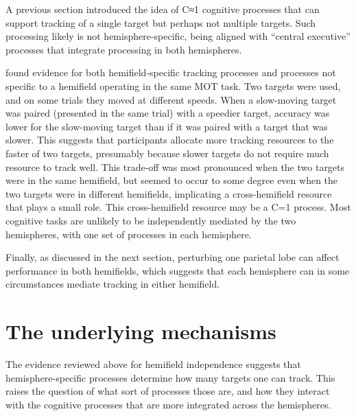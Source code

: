 \documentclass[
]{book}
\begin{document}
A previous section introduced the idea of C≈1 cognitive processes that can support tracking of a single target but perhaps not multiple targets. Such processing likely is not hemisphere-specific, being aligned with ``central executive'' processes that integrate processing in both hemispheres.

\citet{chenResourceDemandsObject2013} found evidence for both hemifield-specific tracking processes and processes not specific to a hemifield operating in the same MOT task. Two targets were used, and on some trials they moved at different speeds. When a slow-moving target was paired (presented in the same trial) with a speedier target, accuracy was lower for the slow-moving target than if it was paired with a target that was slower. This suggests that participants allocate more tracking resources to the faster of two targets, presumably because slower targets do not require much resource to track well. This trade-off was most pronounced when the two targets were in the same hemifield, but seemed to occur to some degree even when the two targets were in different hemifields, implicating a cross-hemifield resource that plays a small role. This cross-hemifield resource may be a C=1 process. Most cognitive tasks are unlikely to be independently mediated by the two hemispheres, with one set of processes in each hemisphere.

Finally, as discussed in the next section, perturbing one parietal lobe can affect performance in both hemifields, which suggests that each hemisphere can in some circumstances mediate tracking in either hemifield.

\hypertarget{the-underlying-mechanisms}{%
\section{The underlying mechanisms}\label{the-underlying-mechanisms}}

The evidence reviewed above for hemifield independence suggests that hemisphere-specific processes determine how many targets one can track. This raises the question of what sort of processes those are, and how they interact with the cognitive processes that are more integrated across the hemispheres.
\end{document}
